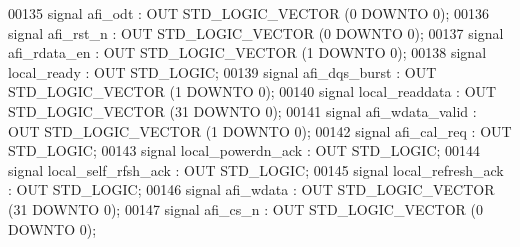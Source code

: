 \begin{DoxyCode}
00135         \textcolor{keywordflow}{signal} afi\_odt : \textcolor{keywordflow}{OUT} \textcolor{comment}{STD\_LOGIC\_VECTOR} (\textcolor{vhdllogic}{}\textcolor{vhdllogic}{0} \textcolor{keywordflow}{DOWNTO} \textcolor{vhdllogic}{}\textcolor{vhdllogic}{0});
00136         \textcolor{keywordflow}{signal} afi\_rst\_n : \textcolor{keywordflow}{OUT} \textcolor{comment}{STD\_LOGIC\_VECTOR} (\textcolor{vhdllogic}{}\textcolor{vhdllogic}{0} \textcolor{keywordflow}{DOWNTO} \textcolor{vhdllogic}{}\textcolor{vhdllogic}{0});
00137         \textcolor{keywordflow}{signal} afi\_rdata\_en : \textcolor{keywordflow}{OUT} \textcolor{comment}{STD\_LOGIC\_VECTOR} (\textcolor{vhdllogic}{}\textcolor{vhdllogic}{1} \textcolor{keywordflow}{DOWNTO} \textcolor{vhdllogic}{}\textcolor{vhdllogic}{0});
00138         \textcolor{keywordflow}{signal} local\_ready : \textcolor{keywordflow}{OUT} \textcolor{comment}{STD\_LOGIC};
00139         \textcolor{keywordflow}{signal} afi\_dqs\_burst : \textcolor{keywordflow}{OUT} \textcolor{comment}{STD\_LOGIC\_VECTOR} (\textcolor{vhdllogic}{}\textcolor{vhdllogic}{1} \textcolor{keywordflow}{DOWNTO} \textcolor{vhdllogic}{}\textcolor{vhdllogic}{0});
00140         \textcolor{keywordflow}{signal} local\_readdata : \textcolor{keywordflow}{OUT} \textcolor{comment}{STD\_LOGIC\_VECTOR} (\textcolor{vhdllogic}{}\textcolor{vhdllogic}{31} \textcolor{keywordflow}{DOWNTO} \textcolor{vhdllogic}{}\textcolor{vhdllogic}{0});
00141         \textcolor{keywordflow}{signal} afi\_wdata\_valid : \textcolor{keywordflow}{OUT} \textcolor{comment}{STD\_LOGIC\_VECTOR} (\textcolor{vhdllogic}{}\textcolor{vhdllogic}{1} \textcolor{keywordflow}{DOWNTO} \textcolor{vhdllogic}{}\textcolor{vhdllogic}{0});
00142         \textcolor{keywordflow}{signal} afi\_cal\_req : \textcolor{keywordflow}{OUT} \textcolor{comment}{STD\_LOGIC};
00143         \textcolor{keywordflow}{signal} local\_powerdn\_ack : \textcolor{keywordflow}{OUT} \textcolor{comment}{STD\_LOGIC};
00144         \textcolor{keywordflow}{signal} local\_self\_rfsh\_ack : \textcolor{keywordflow}{OUT} \textcolor{comment}{STD\_LOGIC};
00145         \textcolor{keywordflow}{signal} local\_refresh\_ack : \textcolor{keywordflow}{OUT} \textcolor{comment}{STD\_LOGIC};
00146         \textcolor{keywordflow}{signal} afi\_wdata : \textcolor{keywordflow}{OUT} \textcolor{comment}{STD\_LOGIC\_VECTOR} (\textcolor{vhdllogic}{}\textcolor{vhdllogic}{31} \textcolor{keywordflow}{DOWNTO} \textcolor{vhdllogic}{}\textcolor{vhdllogic}{0});
00147         \textcolor{keywordflow}{signal} afi\_cs\_n : \textcolor{keywordflow}{OUT} \textcolor{comment}{STD\_LOGIC\_VECTOR} (\textcolor{vhdllogic}{}\textcolor{vhdllogic}{0} \textcolor{keywordflow}{DOWNTO} \textcolor{vhdllogic}{}\textcolor{vhdllogic}{0});

\end{DoxyCode}

